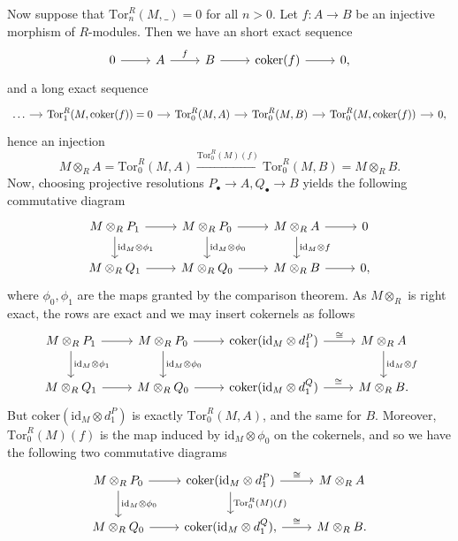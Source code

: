 \documentclass{article}
\theoremstyle{definition}
\newcommand{\coker}{\text{coker}}
\newcommand{\id}{\text{id}}
\newcommand{\Tor}{\text{Tor}}
\begin{document}
Now suppose that $\Tor_{n}^{R}(M, \_) = 0$ for all $n > 0$. Let $f : A \to B$
be an injective morphism of $R$-modules. Then we have an short exact sequence 
\[
\begin{tikzcd}
	0
	\ar{r}
	& A 
	\ar{r}{f}
	& B 
	\ar{r}
	& \coker(f)
	\ar{r}
	& 0,
\end{tikzcd}
\] 
and a long exact sequence 
\[
\begin{tikzcd}[column sep=small]
	\ldots 
	\ar{r}
	& \Tor_{1}^{R}(M, \coker(f)) = 0
	\ar{r}
	& \Tor_{0}^{R}(M, A) 
	\ar{r}
	& \Tor_{0}^{R}(M, B) 
	\ar{r}
	& \Tor_{0}^{R}(M, \coker(f)) 
	\ar{r}
	& 0,
\end{tikzcd}
\] 
hence an injection
\[
	M \otimes_R A
	=
	\Tor^{R}_{0}(M, A) 
	\xrightarrow{\Tor^{R}_{0}(M)(f)}
	\Tor^{R}_{0}(M, B) 
	=
	M \otimes_R B.
\]
Now, choosing projective resolutions $P_{\bullet} \to A, Q_{\bullet} \to B$
yields the following commutative diagram
\[
\begin{tikzcd}
	M \otimes_{R} P_1
	\ar{r}
	\ar{d}{\id_M \otimes \phi_1}
	& M \otimes_{R} P_0
	\ar{r}
	\ar{d}{\id_M \otimes \phi_0}
	& M \otimes_R A
	\ar{d}{\id_M \otimes f}
	\ar{r}
	& 0
	\\
	M \otimes_{R} Q_1
	\ar{r}
	& M \otimes_{R} Q_0
	\ar{r}
	& M \otimes_R B
	\ar{r}
	& 0,
\end{tikzcd}
\] 
where $\phi_0, \phi_1$ are the maps granted by the comparison theorem. 
As $M \otimes_R$ is right exact, the rows are exact and we may insert cokernels 
as follows
\[
\begin{tikzcd}
	M \otimes_{R} P_1
	\ar{r}
	\ar{d}{\id_M \otimes \phi_1}
	& M \otimes_{R} P_0
	\ar{r}
	\ar{d}{\id_M \otimes \phi_0}
	& \coker(\id_{M} \otimes d^{P}_{1})
	\ar{r}{\cong}
	& M \otimes_R A
	\ar{d}{\id_M \otimes f}
	\\
	M \otimes_{R} Q_1
	\ar{r}
	& M \otimes_{R} Q_0
	\ar{r}
	& \coker(\id_{M} \otimes d^{Q}_{1})
	\ar{r}{\cong}
	& M \otimes_R B.
\end{tikzcd}
\]
But $\coker(\id_{M} \otimes d^{P}_{1})$ is exactly $\Tor_0^{R}(M, A)$, and the same for $B$.
Moreover, $\Tor^{R}_{0}(M)(f)$ is the map induced by $\id_{M} \otimes \phi_0$ on the cokernels,
and so we have the following two commutative diagrams
\[
\begin{tikzcd}
	M \otimes_{R} P_0
	\ar{r}
	\ar{d}{\id_M \otimes \phi_0}
	& \coker(\id_{M} \otimes d^{P}_{1})
	\ar{d}{\Tor^{R}_{0}(M)(f)}
	\ar{r}{\cong}
	& M \otimes_R A
	\\
	M \otimes_{R} Q_0
	\ar{r}
	& \coker(\id_{M} \otimes d^{Q}_{1}),
	\ar{r}{\cong}
	& M \otimes_R B.
\end{tikzcd}
\]
\end{document}
